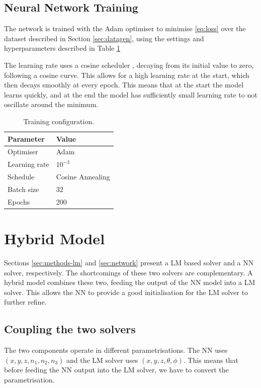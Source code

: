\subsection{Neural Network Training}
The network is trained with the Adam optimiser \cite{kingma2017} to minimise \eqref{eq:loss} over the dataset described in Section \ref{sec:datagen}, using the settings and hyperparameters described in Table \ref{tab:training}

The learning rate uses a cosine scheduler \cite{loshchilov2017}, decaying from its initial value to zero, following a cosine curve. This allows for a high learning rate at the start, which then decays smoothly at every epoch. This means that at the start the model learns quickly, and at the end the model has sufficiently small learning rate to not oscillate around the minimum. 

\begin{table}
  \centering
  \begin{tabular}{ll}
    \toprule
    Parameter & Value \\
    \midrule
    Optimiser       & Adam \\
    Learning rate   & $10^{-3}$ \\
    Schedule        & Cosine Annealing \\
    Batch size      & 32 \\
    Epochs          & 200 \\
    \bottomrule
  \end{tabular}
  \caption{Training configuration.}
  \label{tab:training}
\end{table}
\section{Hybrid Model}\label{sec:hybrid}
Sections \ref{sec:methods-lm} and \ref{sec:network} present a LM based solver and a NN solver, respectively. The shortcomings of these two solvers are complementary. A hybrid model combines these two, feeding the output of the NN model into a LM solver. This allows the NN to provide a good initialisation for the LM solver to further refine.

\subsection{Coupling the two solvers}
The two components operate in different parametrisations. The NN uses $(x,y,z,n_1,n_2,n_3)$ and the LM solver uses $(x,y,z,\theta,\phi)$. This means that before feeding the NN output into the LM solver, we have to convert the parametrisation.

